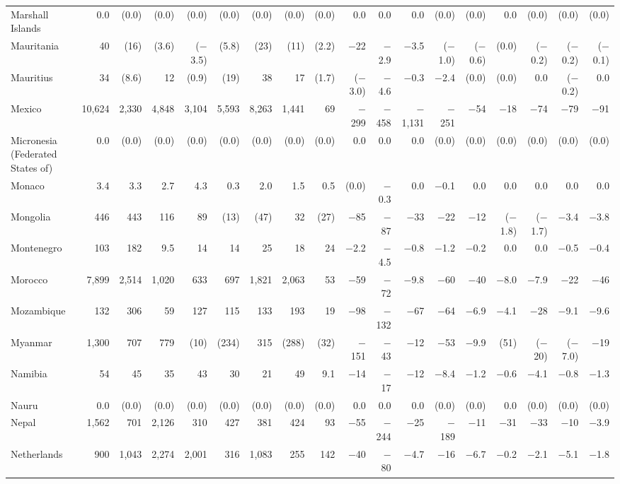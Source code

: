 \begin{longtable}{lrrrrrrrrrrrrrrrrr}
Marshall Islands & 0.0 & (0.0) & (0.0) & (0.0) & (0.0) & (0.0) & (0.0) & (0.0) & 0.0 & 0.0 & 0.0 & (0.0) & (0.0) & 0.0 & (0.0) & (0.0) & (0.0) \\
Mauritania & 40 & (16) & (3.6) & ($-$3.5) & (5.8) & (23) & (11) & (2.2) & $-$22 & $-$2.9 & $-$3.5 & ($-$1.0) & ($-$0.6) & (0.0) & ($-$0.2) & ($-$0.2) & ($-$0.1) \\
Mauritius & 34 & (8.6) & 12 & (0.9) & (19) & 38 & 17 & (1.7) & ($-$3.0) & $-$4.6 & $-$0.3 & $-$2.4 & (0.0) & (0.0) & 0.0 & ($-$0.2) & 0.0 \\
Mexico & 10,624 & 2,330 & 4,848 & 3,104 & 5,593 & 8,263 & 1,441 & 69 & $-$299 & $-$458 & $-$1,131 & $-$251 & $-$54 & $-$18 & $-$74 & $-$79 & $-$91 \\
Micronesia (Federated States of) & 0.0 & (0.0) & (0.0) & (0.0) & (0.0) & (0.0) & (0.0) & (0.0) & 0.0 & 0.0 & 0.0 & (0.0) & (0.0) & (0.0) & (0.0) & (0.0) & (0.0) \\
Monaco & 3.4 & 3.3 & 2.7 & 4.3 & 0.3 & 2.0 & 1.5 & 0.5 & (0.0) & $-$0.3 & 0.0 & $-$0.1 & 0.0 & 0.0 & 0.0 & 0.0 & 0.0 \\
Mongolia & 446 & 443 & 116 & 89 & (13) & (47) & 32 & (27) & $-$85 & $-$87 & $-$33 & $-$22 & $-$12 & ($-$1.8) & ($-$1.7) & $-$3.4 & $-$3.8 \\
Montenegro & 103 & 182 & 9.5 & 14 & 14 & 25 & 18 & 24 & $-$2.2 & $-$4.5 & $-$0.8 & $-$1.2 & $-$0.2 & 0.0 & 0.0 & $-$0.5 & $-$0.4 \\
Morocco & 7,899 & 2,514 & 1,020 & 633 & 697 & 1,821 & 2,063 & 53 & $-$59 & $-$72 & $-$9.8 & $-$60 & $-$40 & $-$8.0 & $-$7.9 & $-$22 & $-$46 \\
Mozambique & 132 & 306 & 59 & 127 & 115 & 133 & 193 & 19 & $-$98 & $-$132 & $-$67 & $-$64 & $-$6.9 & $-$4.1 & $-$28 & $-$9.1 & $-$9.6 \\
Myanmar & 1,300 & 707 & 779 & (10) & (234) & 315 & (288) & (32) & $-$151 & $-$43 & $-$12 & $-$53 & $-$9.9 & (51) & ($-$20) & ($-$7.0) & $-$19 \\
Namibia & 54 & 45 & 35 & 43 & 30 & 21 & 49 & 9.1 & $-$14 & $-$17 & $-$12 & $-$8.4 & $-$1.2 & $-$0.6 & $-$4.1 & $-$0.8 & $-$1.3 \\
Nauru & 0.0 & (0.0) & (0.0) & (0.0) & (0.0) & (0.0) & (0.0) & (0.0) & 0.0 & 0.0 & 0.0 & (0.0) & (0.0) & 0.0 & (0.0) & (0.0) & (0.0) \\
Nepal & 1,562 & 701 & 2,126 & 310 & 427 & 381 & 424 & 93 & $-$55 & $-$244 & $-$25 & $-$189 & $-$11 & $-$31 & $-$33 & $-$10 & $-$3.9 \\
Netherlands & 900 & 1,043 & 2,274 & 2,001 & 316 & 1,083 & 255 & 142 & $-$40 & $-$80 & $-$4.7 & $-$16 & $-$6.7 & $-$0.2 & $-$2.1 & $-$5.1 & $-$1.8 \\

\end{longtable}

